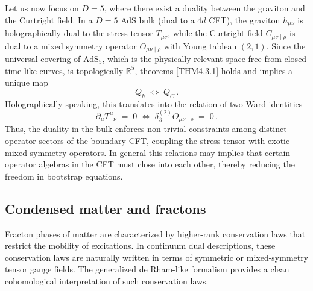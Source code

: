 \documentclass[a4paper,12pt]{article}
\begin{document}
Let us now focus on $D=5$, where there exist a duality between the graviton and the Curtright field. In a $D=5$ AdS bulk (dual to a $4d$ CFT), the graviton $h_{\mu\nu}$ is holographically dual to the stress tensor $T_{\mu\nu}$, while the Curtright field $C_{\mu\nu\mid\rho}$ is dual to a mixed symmetry operator $O_{\mu\nu\mid\rho}$ with Young tableau $(2,1)$. Since the universal covering of AdS$_5$, which is the physically relevant space free from closed time-like curves, is topologically $\mathbb{R}^5$, theorems \ref{THM4.3.1} holds and implies a unique map
\begin{equation}
  Q_{h} \;\Longleftrightarrow\; Q_{C} \, .
\end{equation}
Holographically speaking, this translates into the relation of two Ward identities
\begin{equation}
  \partial_{\mu} T^{\mu}{}_{\nu} \;=\; 0 
  \;\Longleftrightarrow\; 
  \delta_{\partial}^{(2)} O_{\mu\nu\mid\rho} \;=\; 0 \, .
\end{equation}
Thus, the duality in the bulk enforces non-trivial constraints among distinct operator sectors of the boundary CFT, coupling the stress tensor with exotic mixed-symmetry operators. In general this relations may implies that certain operator algebras in the CFT must close into each other, thereby reducing the freedom in bootstrap equations.
\subsection{Condensed matter and fractons}
Fracton phases of matter \cite{PretkoChenYou2020,NandkishoreHermele2019,Gromov2019,Prem2019,Shirley2018,Vijay2016} are characterized by higher-rank conservation laws that restrict the mobility of excitations. In continuum dual descriptions, these conservation laws are naturally written in terms of symmetric or mixed-symmetry tensor gauge fields. The generalized de Rham-like formalism provides a clean cohomological interpretation of such conservation laws.
\end{document}
